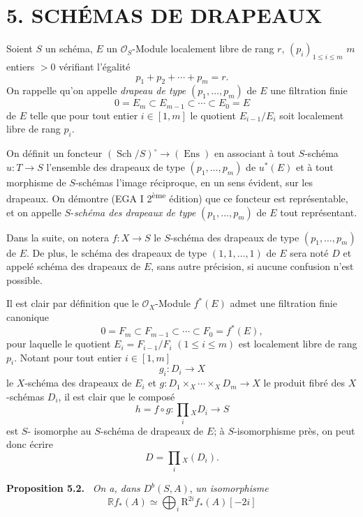 \documentclass[11pt]{article}
\newenvironment{statement}[1]{\par\medskip\noindent\textbf{#1.}\ }{\par\medskip}
\newcommand{\R}{\mathbb{R}}\newcommand{\RHomCore}{\mathbb{R}\mathrm{Hom}}
\providecommand{\R}{\mathrm R}
\begin{document}
\section*{5. SCHÉMAS DE DRAPEAUX}

Soient $S$ un schéma, $E$ un $\mathcal O_S$-Module localement libre de rang $r$, $(p_i)_{1\le i\le m}$ $m$ entiers $>0$ vérifiant l'égalité
\[
p_1+p_2+\cdots+p_m=r.
\]
On rappelle qu'on appelle \emph{drapeau de type} $(p_1,\ldots,p_m)$ de $E$ une filtration finie
\[
0=E_m\subset E_{m-1}\subset\cdots\subset E_0=E
\]
de $E$ telle que pour tout entier $i\in[1,m]$ le quotient $E_{i-1}/E_i$ soit localement libre de rang $p_i$.

On définit un foncteur $(\operatorname{Sch}/S)^\circ\to(\operatorname{Ens})$ en associant à tout $S$-schéma $u:T\to S$ l'ensemble des drapeaux de type $(p_1,\ldots,p_m)$ de $u^*(E)$ et à tout morphisme de $S$-schémas l'image réciproque, en un sens évident, sur les drapeaux. On démontre (EGA I 2\textsuperscript{ème} édition) que ce foncteur est représentable, et on appelle $S$-\emph{schéma des drapeaux de type} $(p_1,\ldots,p_m)$ de $E$ tout représentant.

Dans la suite, on notera $f:X\to S$ le $S$-schéma des drapeaux de type $(p_1,\ldots,p_m)$ de $E$. De plus, le schéma des drapeaux de type $(1,1,\ldots,1)$ de $E$ sera noté $D$ et appelé schéma des drapeaux de $E$, sans autre précision, si aucune confusion n'est possible.

Il est clair par définition que le $\mathcal O_X$-Module $f^*(E)$ admet une filtration finie canonique
\[
0=F_m\subset F_{m-1}\subset\cdots\subset F_0=f^*(E),
\]
pour laquelle le quotient $E_i=F_{i-1}/F_i$ $(1\le i\le m)$ est localement libre de rang $p_i$. Notant pour tout entier $i\in[1,m]$
\[
g_i:D_i\to X
\]
le $X$-schéma des drapeaux de $E_i$ et $g:D_1\times_X\cdots\times_X D_m\to X$ le produit fibré des $X$-schémas $D_i$, il est clair que le composé
\[
h=f\circ g:\prod_i{}_XD_i\to S
\tag{5.1}
\]
est $S$-
isomorphe au $S$-schéma de drapeaux de $E$; à $S$-isomorphisme près, on peut donc écrire
\[
D=\prod_i{}_X(D_i).
\]

\begin{statement}{Proposition 5.2}
\emph{On a, dans} $D^b(S,A)$, \emph{un isomorphisme}
\[
\R f_*(A)\simeq\bigoplus_i \mathrm{R}^{2i}f_*(A)[-2i]
\]
\end{statement}
\end{document}

